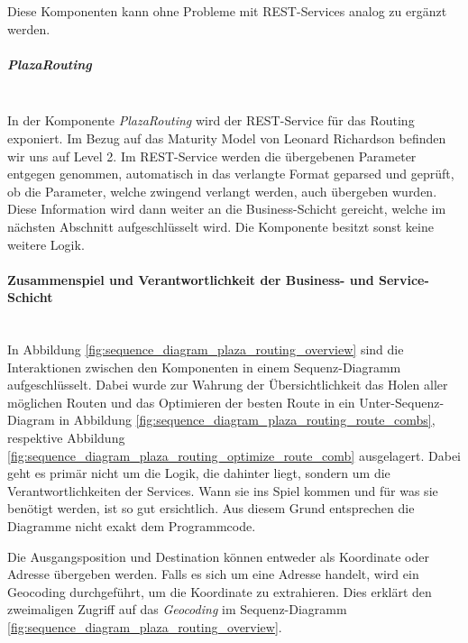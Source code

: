 Diese Komponenten kann ohne Probleme mit \ac{REST}-Services analog zu  ergänzt werden.

\subparagraph{PlazaRouting}\label{impl:PlazaRouting}~\\
In der Komponente \emph{PlazaRouting} wird der \ac{REST}-Service für das Routing exponiert. Im Bezug auf das Maturity Model \cite{maturity_model} von Leonard Richardson befinden wir uns auf Level 2. Im \ac{REST}-Service werden die übergebenen Parameter entgegen genommen, automatisch in das verlangte Format geparsed und geprüft, ob die Parameter, welche zwingend verlangt werden, auch übergeben wurden. Diese Information wird dann weiter an die Business-Schicht gereicht, welche im nächsten Abschnitt aufgeschlüsselt wird. Die Komponente besitzt sonst keine weitere Logik.

\paragraph{Zusammenspiel und Verantwortlichkeit der Business- und Service-Schicht}\label{impl:Plaza Routing Zusammenspielund Verantwortlichkeit der Business- und Service-Schicht}~\\
In Abbildung \ref{fig:sequence_diagram_plaza_routing_overview} sind die Interaktionen zwischen den Komponenten in einem Sequenz-Diagramm aufgeschlüsselt. Dabei wurde zur Wahrung der Übersichtlichkeit das Holen aller möglichen Routen und das Optimieren der besten Route in ein Unter-Sequenz-Diagram in Abbildung \ref{fig:sequence_diagram_plaza_routing_route_combs}, respektive Abbildung \ref{fig:sequence_diagram_plaza_routing_optimize_route_comb} ausgelagert. Dabei geht es primär nicht um die Logik, die dahinter liegt, sondern um die Verantwortlichkeiten der Services. Wann sie ins Spiel kommen und für was sie benötigt werden, ist so gut ersichtlich. Aus diesem Grund entsprechen die Diagramme nicht exakt dem Programmcode. 

Die Ausgangsposition und Destination können entweder als Koordinate oder Adresse übergeben werden. Falls es sich um eine Adresse handelt, wird ein Geocoding durchgeführt, um die Koordinate zu extrahieren. Dies erklärt den zweimaligen Zugriff auf das \emph{Geocoding} im Sequenz-Diagramm \ref{fig:sequence_diagram_plaza_routing_overview}.

